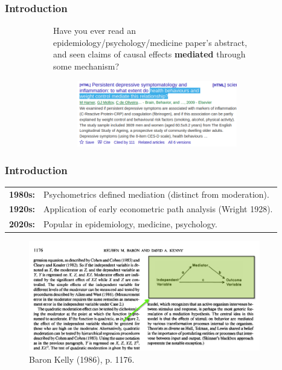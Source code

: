 \documentclass[dvipsnames,handout]{beamer} %
\begin{document}
\begin{frame}[noframenumbering]
    \frametitle{Introduction}
    \begin{figure}[h!]
        \centering
        \singlespacing
        \begin{subfigure}[c]{\textwidth}
            Have you ever read an epidemiology/psychology/medicine paper's abstract, and seen claims of causal effects \textbf{mediated} through some mechanism?
        \end{subfigure}
        \begin{subfigure}[c]{0.75\textwidth}
            \centering
            \singlespacing
            \begin{subfigure}[c]{\textwidth}
                \centering
                \includegraphics[width=\textwidth]{presentation-files/headlines/hamer-2009.png}
            \end{subfigure}
        \end{subfigure}
    \end{figure}
\end{frame}
\begin{frame}[noframenumbering]
    \frametitle{Introduction}
    \begin{tabular}{l l}
        \textbf{1980s:}
        & Psychometrics defined mediation (distinct from moderation). \\
        \textbf{1920s:} 
        & Application of early econometric path analysis (Wright 1928). \\
        \textbf{2020s:}
        & Popular in epidemiology, medicine, psychology.
    \end{tabular}
    \vskip-0.75cm
    \begin{figure}
        \centering
        \singlespacing
        \caption{Baron Kelly (1986), p. 1176.}
        \vskip-0.25cm
        \includegraphics[width=0.9\textwidth]{presentation-files/headlines/baronkelly-1986.png}
    \end{figure}
\end{frame}
\end{document}

